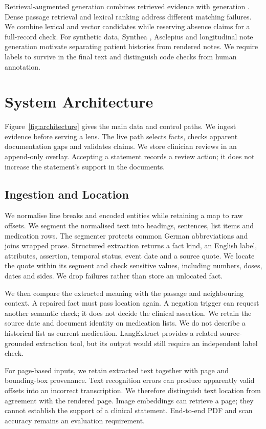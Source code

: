 \documentclass[10pt]{article}
\begin{document}
Retrieval-augmented generation combines retrieved evidence with generation
\citep{rag}. Dense passage retrieval \citep{dpr} and lexical ranking address different
matching failures. We combine lexical and vector candidates while reserving absence
claims for a full-record check. For synthetic data, Synthea \citep{synthea},
Asclepius \citep{asclepius} and longitudinal note generation \citep{nhs} motivate
separating patient histories from rendered notes. We require labels to survive in
the final text and distinguish code checks from human annotation.

\FloatBarrier
\section{System Architecture}
Figure~\ref{fig:architecture} gives the main data and control paths. We ingest evidence
before serving a lens. The live path selects facts, checks apparent documentation
gaps and validates claims. We store clinician reviews in an append-only overlay.
Accepting a statement records a review action; it does not increase the statement's
support in the documents.


\subsection{Ingestion and Location}
We normalise line breaks and encoded entities while retaining a map to raw offsets.
We segment the normalised text into headings, sentences, list items and medication
rows. The segmenter protects common German abbreviations and joins wrapped prose.
Structured extraction returns a fact kind, an English label, attributes, assertion,
temporal status, event date and a source quote. We locate the quote within its
segment and check sensitive values, including numbers, doses, dates and sides.
We drop failures rather than store an unlocated fact.

We then compare the extracted meaning with the passage and neighbouring context.
A repaired fact must pass location again. A negation trigger can request another
semantic check; it does not decide the clinical assertion. We retain the source date
and document identity on medication lists. We do not describe a historical list as
current medication. LangExtract \citep{langextract} provides a related source-grounded
extraction tool, but its output would still require an independent label check.

For page-based inputs, we retain extracted text together with page and bounding-box
provenance. Text recognition errors can produce apparently valid offsets into an
incorrect transcription. We therefore distinguish text location from agreement with
the rendered page. Image embeddings can retrieve a page; they cannot establish the
support of a clinical statement. End-to-end PDF and scan accuracy remains an
evaluation requirement.
\end{document}
